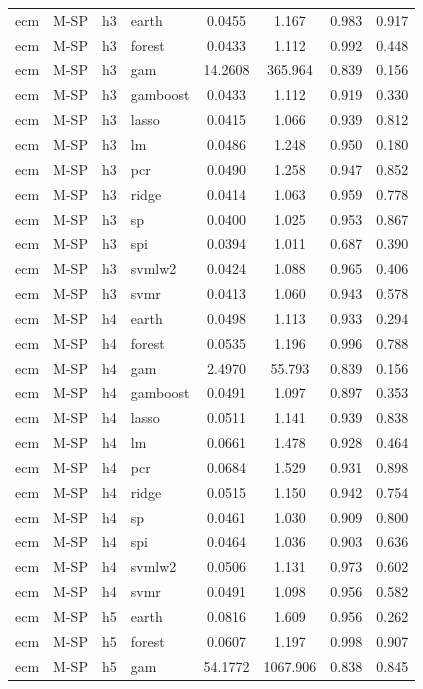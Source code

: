\begin{ThreePartTable}
\begin{longtable}[t]{llclcccc}
ecm & M-SP & h3 & earth & 0.0455 & 1.167 & 0.983 & 0.917\\
ecm & M-SP & h3 & forest & 0.0433 & 1.112 & 0.992 & 0.448\\
ecm & M-SP & h3 & gam & 14.2608 & 365.964 & 0.839 & 0.156\\
ecm & M-SP & h3 & gamboost & 0.0433 & 1.112 & 0.919 & 0.330\\
ecm & M-SP & h3 & lasso & 0.0415 & 1.066 & 0.939 & 0.812\\
ecm & M-SP & h3 & lm & 0.0486 & 1.248 & 0.950 & 0.180\\
ecm & M-SP & h3 & pcr & 0.0490 & 1.258 & 0.947 & 0.852\\
ecm & M-SP & h3 & ridge & 0.0414 & 1.063 & 0.959 & 0.778\\
ecm & M-SP & h3 & sp & 0.0400 & 1.025 & 0.953 & 0.867\\
ecm & M-SP & h3 & spi & 0.0394 & 1.011 & 0.687 & 0.390\\
ecm & M-SP & h3 & svmlw2 & 0.0424 & 1.088 & 0.965 & 0.406\\
ecm & M-SP & h3 & svmr & 0.0413 & 1.060 & 0.943 & 0.578\\
\addlinespace
ecm & M-SP & h4 & earth & 0.0498 & 1.113 & 0.933 & 0.294\\
ecm & M-SP & h4 & forest & 0.0535 & 1.196 & 0.996 & 0.788\\
ecm & M-SP & h4 & gam & 2.4970 & 55.793 & 0.839 & 0.156\\
ecm & M-SP & h4 & gamboost & 0.0491 & 1.097 & 0.897 & 0.353\\
ecm & M-SP & h4 & lasso & 0.0511 & 1.141 & 0.939 & 0.838\\
ecm & M-SP & h4 & lm & 0.0661 & 1.478 & 0.928 & 0.464\\
ecm & M-SP & h4 & pcr & 0.0684 & 1.529 & 0.931 & 0.898\\
ecm & M-SP & h4 & ridge & 0.0515 & 1.150 & 0.942 & 0.754\\
ecm & M-SP & h4 & sp & 0.0461 & 1.030 & 0.909 & 0.800\\
ecm & M-SP & h4 & spi & 0.0464 & 1.036 & 0.903 & 0.636\\
ecm & M-SP & h4 & svmlw2 & 0.0506 & 1.131 & 0.973 & 0.602\\
ecm & M-SP & h4 & svmr & 0.0491 & 1.098 & 0.956 & 0.582\\
\addlinespace
ecm & M-SP & h5 & earth & 0.0816 & 1.609 & 0.956 & 0.262\\
ecm & M-SP & h5 & forest & 0.0607 & 1.197 & 0.998 & 0.907\\
ecm & M-SP & h5 & gam & 54.1772 & 1067.906 & 0.838 & 0.845\\

\end{longtable}
\end{ThreePartTable}
